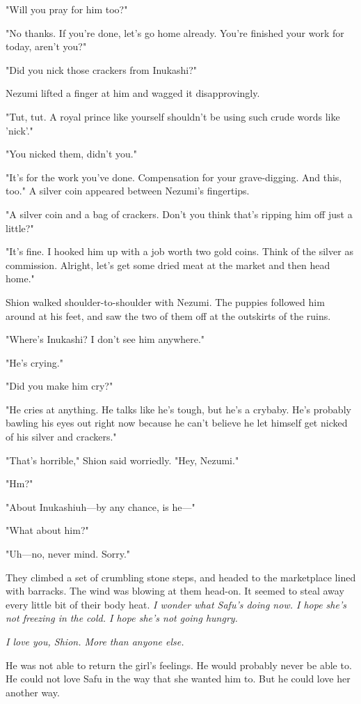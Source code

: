 "Will you pray for him too?"

"No thanks. If you're done, let's go home already. You're finished your
work for today, aren't you?"

"Did you nick those crackers from Inukashi?"

Nezumi lifted a finger at him and wagged it disapprovingly.

"Tut, tut. A royal prince like yourself shouldn't be using such crude
words like 'nick'."

"You nicked them, didn't you."

"It's for the work you've done. Compensation for your grave-digging. And
this, too." A silver coin appeared between Nezumi's fingertips.

"A silver coin and a bag of crackers. Don't you think that's ripping him
off just a little?"

"It's fine. I hooked him up with a job worth two gold coins. Think of
the silver as commission. Alright, let's get some dried meat at the
market and then head home."

Shion walked shoulder-to-shoulder with Nezumi. The puppies followed him
around at his feet, and saw the two of them off at the outskirts of the
ruins.

"Where's Inukashi? I don't see him anywhere."

"He's crying."

"Did you make him cry?"

"He cries at anything. He talks like he's tough, but he's a crybaby.
He's probably bawling his eyes out right now because he can't believe he
let himself get nicked of his silver and crackers."

"That's horrible," Shion said worriedly. "Hey, Nezumi."

"Hm?"

"About Inukashi\el uh---by any chance, is he---"

"What about him?"

"Uh---no, never mind. Sorry."

They climbed a set of crumbling stone steps, and headed to the
marketplace lined with barracks. The wind was blowing at them head-on.
It seemed to steal away every little bit of their body heat. \emph{I wonder
what Safu's doing now. I hope she's not freezing in the cold. I hope
she's not going hungry.}

\emph{I love you, Shion. More than anyone else.}

He was not able to return the girl's feelings. He would probably never
be able to. He could not love Safu in the way that she wanted him to.
But he could love her another way.

